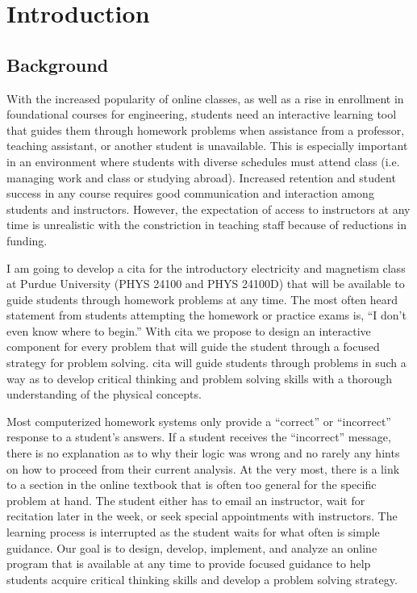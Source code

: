\chapter[Chapter 1: Introduction]{Introduction}

\section{Background}

With the increased popularity of online classes, as well as a rise in enrollment in foundational courses for engineering, students need an interactive learning tool that guides them through homework problems when assistance from a professor, teaching assistant, or another student is unavailable. This is especially important in an environment where students with diverse schedules must attend class (i.e. managing work and class or studying abroad). Increased retention and student success in any course requires good communication and interaction among students and instructors.  However, the expectation of access to instructors at any time is unrealistic with the constriction in teaching staff because of reductions in funding.

I am going to develop a \gls{cita} for the introductory electricity and magnetism class at Purdue University (PHYS 24100 and PHYS 24100D) that will be available to guide students through homework problems at any time. The most often heard statement from students attempting the homework or practice exams is, ``I don’t even know where to begin.'' With \gls{cita} we propose to design an interactive component for every problem that will guide the student through a focused strategy for problem solving. \gls{cita} will guide students through problems in such a way as to develop critical thinking and problem solving skills with a thorough understanding of the physical concepts.

Most computerized homework systems only provide a ``correct'' or ``incorrect'' response to a student’s answers. If a student receives the ``incorrect'' message, there is no explanation as to why their logic was wrong and no rarely any hints on how to proceed from their current analysis. At the very most, there is a link to a section in the online textbook that is often too general for the specific problem at hand. The student either has to email an instructor, wait for recitation later in the week, or seek special appointments with instructors. The learning process is interrupted as the student waits for what often is simple guidance. Our goal is to design, develop, implement, and analyze an online program that is available at any time to provide focused guidance to help students acquire critical thinking skills and develop a problem solving strategy.

